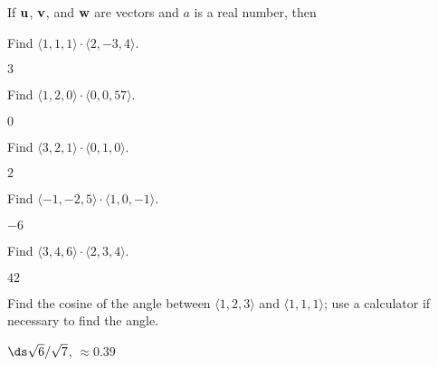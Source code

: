 \begin{theorem}
If ${\bf u}$, ${\bf v}$, and ${\bf w}$ are vectors and $a$ is a real
number, then
\label{thm:dot product properties}


\begin{exercises}

\begin{exercise} Find $\langle 1,1,1\rangle\cdot\langle 2,-3,4\rangle$.
\begin{answer} $3$
\end{answer}\end{exercise}

\begin{exercise} Find $\langle 1,2,0\rangle\cdot\langle 0,0,57\rangle$.
\begin{answer} $0$
\end{answer}\end{exercise}

\begin{exercise} Find $\langle 3,2,1\rangle\cdot\langle 0,1,0\rangle$.
\begin{answer} $2$
\end{answer}\end{exercise}

\begin{exercise} Find $\langle -1,-2,5\rangle\cdot\langle 1,0,-1 \rangle$.
\begin{answer} $-6$
\end{answer}\end{exercise}

\begin{exercise} Find $\langle 3,4,6\rangle\cdot\langle 2,3,4\rangle$.
\begin{answer} $42$
\end{answer}\end{exercise}

\begin{exercise} Find the cosine of the angle between $\langle 1,2,3\rangle$
and $\langle 1,1,1\rangle$; use a calculator if necessary to find the angle.
\begin{answer} $\ds \sqrt6/\sqrt7$, $\approx 0.39$
\end{answer}\end{exercise}


\end{exercises}
\end{theorem}
